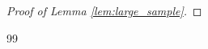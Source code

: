 \documentclass[11pt,a4paper]{article}
\begin{document}
\begin{proof}[Proof of Lemma \ref{lem:large_sample}]
\end{proof}



\begin{thebibliography}{99}

\end{thebibliography}
\end{document}
